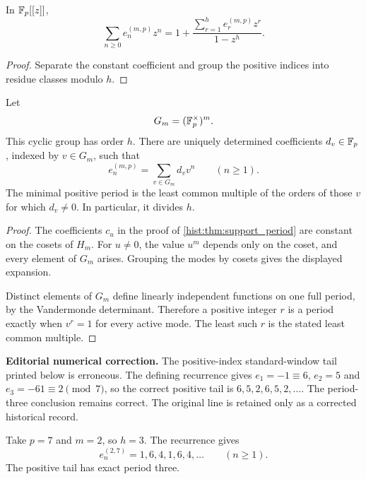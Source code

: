 \begin{histcorollary}\label{hist:cor:periodic_ogf}
In \(\mathbb F_p[[z]]\),
\[
\boxed{
\sum_{n\geq0}e_n^{(m,p)}z^n
=
1+
\frac{
\sum_{r=1}^{h}e_r^{(m,p)}z^r
}{1-z^h}.
}
\]
\end{histcorollary}

\begin{proof}
Separate the constant coefficient and group the positive indices into residue classes modulo \(h\).
\end{proof}

\begin{histtheorem}\label{hist:thm:minimal_period}
Let
\[
G_m=(\mathbb F_p^\times)^m.
\]
This cyclic group has order \(h\). There are uniquely determined coefficients \(d_v\in\mathbb F_p\), indexed by \(v\in G_m\), such that
\[
\boxed{
e_n^{(m,p)}
=
\sum_{v\in G_m}d_vv^n
\qquad(n\geq1).
}
\]
The minimal positive period is the least common multiple of the orders of those \(v\) for which \(d_v\neq0\). In particular, it divides \(h\).
\end{histtheorem}

\begin{proof}
The coefficients \(c_u\) in the proof of \cref{hist:thm:support_period} are constant on the cosets of \(H_m\). For \(u\neq0\), the value \(u^m\) depends only on the coset, and every element of \(G_m\) arises. Grouping the modes by cosets gives the displayed expansion.

Distinct elements of \(G_m\) define linearly independent functions on one full period, by the Vandermonde determinant. Therefore a positive integer \(r\) is a period exactly when \(v^r=1\) for every active mode. The least such \(r\) is the stated least common multiple.
\end{proof}

\begin{histexample}\label{hist:ex:compressed_mod_seven}
\par\noindent\textbf{Editorial numerical correction.} The positive-index standard-window tail printed below is erroneous. The defining recurrence gives $e_1=-1\equiv6$, $e_2=5$ and $e_3=-61\equiv2\pmod7$, so the correct positive tail is $6,5,2,6,5,2,\ldots$. The period-three conclusion remains correct. The original line is retained only as a corrected historical record.\par\medskip
Take \(p=7\) and \(m=2\), so \(h=3\). The recurrence gives
\[
e_n^{(2,7)}
=
1,6,4,1,6,4,\ldots
\qquad(n\geq1).
\]
The positive tail has exact period three.
\end{histexample}

